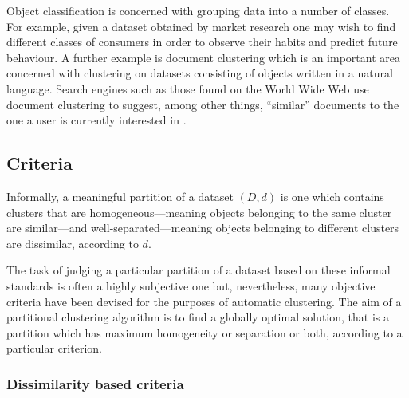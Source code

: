 Object classification is concerned with grouping data into a number of
classes.  For example, given a dataset obtained by market research one may
wish to find different classes of consumers in order to observe their habits
and predict future behaviour.  A further example is document clustering which
is an important area concerned with clustering on datasets consisting of
objects written in a natural language.  Search engines such as those found on
the World Wide Web use document clustering to suggest, among other things,
``similar'' documents to the one a user is currently interested in
\citep{steinbach2000comparison}.

\subsection{Criteria}
\label{sec:criteria}

Informally, a meaningful partition of a dataset $(D,d)$ is one which contains
clusters that are homogeneous---meaning objects belonging to the same cluster
are similar---and well-separated---meaning objects belonging to different
clusters are dissimilar, according to $d$.

The task of judging a particular partition of a dataset based on these
informal standards is often a highly subjective one but, nevertheless, many
objective criteria have been devised for the purposes of automatic clustering.
The aim of a partitional clustering algorithm is to find a globally optimal
solution, that is a partition which has maximum homogeneity or separation or
both, according to a particular criterion.

\subsubsection{Dissimilarity based criteria}
\label{sec:diss-based-crit}

